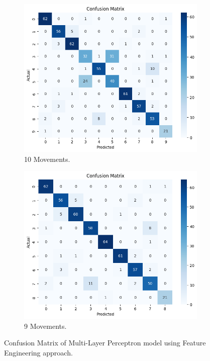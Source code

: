             \begin{figure}[h]
                \begin{subfigure}{.5\textwidth}
                \centering
                  \includegraphics[width=1.\linewidth]{../src/resources/plots/fe.png}
                  \caption{10 Movements.}
                  \label{fig:cm_all}
                \end{subfigure}%
                \begin{subfigure}{.5\textwidth}
                \centering
                  \includegraphics[width=1.\linewidth]{../src/resources/plots/fe-remove.png}
                  \caption{9 Movements.}
                  \label{fig:cm_remove}
                \end{subfigure}
                \caption{Confusion Matrix of Multi-Layer Perceptron model using Feature Engineering approach.}
            \end{figure}
            
